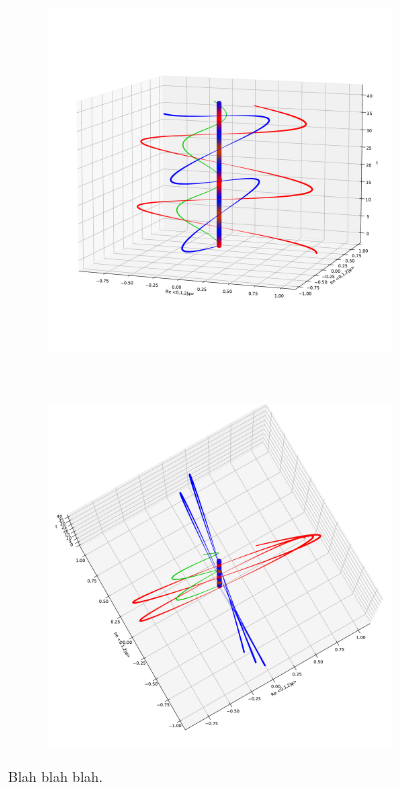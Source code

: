\begin{figure}
  \centering
  \begin{subfigure}[b]{1.0\textwidth}
    \includegraphics[height=0.5\textheight]{img/3ldetect/hermitianSpaceTime_side.pdf}
  \end{subfigure}
  \\
  \begin{subfigure}[b]{1.0\textwidth}
    \includegraphics[height=0.5\textheight]{img/3ldetect/hermitianSpaceTime_top.pdf}
    \label{fig:aabsorbed-qubit-components_pwlattice:im1}
  \end{subfigure}
  \caption{
    Blah blah blah.
  }
  \label{fig:aabsorbed-qubit-components_pwlattice}
\end{figure}
